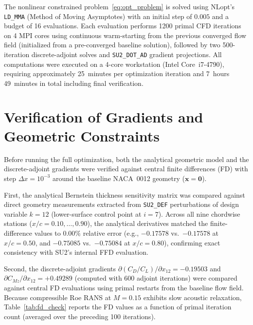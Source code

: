 \documentclass[11pt,a4paper]{article}
\begin{document}
The nonlinear constrained problem~\eqref{eq:opt_problem} is solved using NLopt's \texttt{LD\_MMA} (Method of Moving Asymptotes) with an initial step of $0.005$ and a budget of 16 evaluations. Each evaluation performs 1200 primal CFD iterations on 4 MPI cores using continuous warm-starting from the previous converged flow field (initialized from a pre-converged baseline solution), followed by two 500-iteration discrete-adjoint solves and \texttt{SU2\_DOT\_AD} gradient projections. All computations were executed on a 4-core workstation (Intel Core~i7-4790), requiring approximately 25~minutes per optimization iteration and 7~hours 49~minutes in total including final verification.

\section{Verification of Gradients and Geometric Constraints}

Before running the full optimization, both the analytical geometric model and the discrete-adjoint gradients were verified against central finite differences (FD) with step $\Delta x = 10^{-3}$ around the baseline NACA~0012 geometry ($\mathbf{x} = \mathbf{0}$).

First, the analytical Bernstein thickness sensitivity matrix was compared against direct geometry measurements extracted from \texttt{SU2\_DEF} perturbations of design variable $k = 12$ (lower-surface control point at $i = 7$). Across all nine chordwise stations ($x/c = 0.10, \dots, 0.90$), the analytical derivatives matched the finite-difference values to $0.00\%$ relative error (e.g., $-0.17578$ vs.\ $-0.17578$ at $x/c = 0.50$, and $-0.75085$ vs.\ $-0.75084$ at $x/c = 0.80$), confirming exact consistency with SU2's internal FFD evaluation.

Second, the discrete-adjoint gradients $\partial(C_D/C_L)/\partial x_{12} = -0.19503$ and $\partial C_{Mz}/\partial x_{12} = +0.49289$ (computed with 600 adjoint iterations) were compared against central FD evaluations using primal restarts from the baseline flow field. Because compressible Roe RANS at $M = 0.15$ exhibits slow acoustic relaxation, Table~\ref{tab:fd_check} reports the FD values as a function of primal iteration count (averaged over the preceding 100 iterations).
\end{document}
